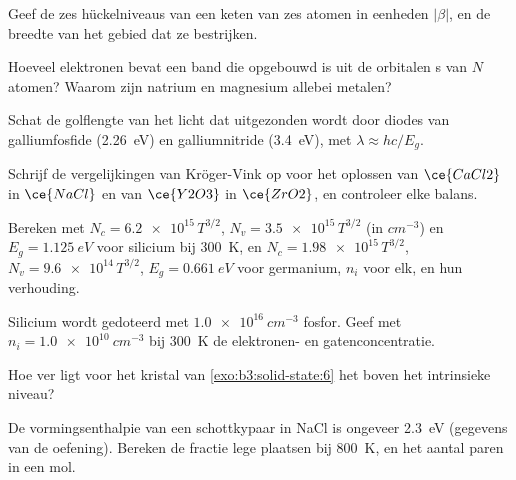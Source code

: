 \begin{exercise}[$\star$]\label{exo:b3:solid-state:1}
Geef de zes hückelniveaus van een keten van zes atomen in eenheden $|\beta|$, en de
breedte van het gebied dat ze bestrijken.
\end{exercise}

\begin{exercise}[$\star$]\label{exo:b3:solid-state:2}
Hoeveel elektronen bevat een band die opgebouwd is uit de orbitalen s
van $N$ atomen? Waarom
zijn natrium en magnesium allebei metalen?
\end{exercise}

\begin{exercise}[$\star$]\label{exo:b3:solid-state:3}
Schat de golflengte van het licht dat uitgezonden wordt door diodes van
galliumfosfide
(\qty{2.26}{eV}) en galliumnitride (\qty{3.4}{eV}), met $\lambda \approx hc/E_g$.
\end{exercise}

\begin{exercise}[$\star$]\label{exo:b3:solid-state:4}
Schrijf de vergelijkingen van Kröger-Vink op voor het oplossen van $\ce{CaCl2}$ in $\ce{NaCl}$ en van $\ce{Y2O3}$ in $\ce{ZrO2}$, en
controleer elke balans.
\end{exercise}

\begin{exercise}[$\star\star$]\label{exo:b3:solid-state:5}
Bereken met $N_c = \num{6.2e15}\,T^{3/2}$, $N_v = \num{3.5e15}\,T^{3/2}$ (in $\unit{cm^{-3}}$) en $E_g = \qty{1.125}{eV}$ voor silicium bij \qty{300}{K},
en $N_c = \num{1.98e15}\,T^{3/2}$, $N_v = \num{9.6e14}\,T^{3/2}$, $E_g = \qty{0.661}{eV}$ voor germanium, $n_i$ voor elk, en hun
verhouding.
\end{exercise}

\begin{exercise}[$\star\star$]\label{exo:b3:solid-state:6}
Silicium wordt gedoteerd met $\qty{1.0e16}{cm^{-3}}$ fosfor. Geef met $n_i = \qty{1.0e10}{cm^{-3}}$ bij \qty{300}{K} de
elektronen- en gatenconcentratie.
\end{exercise}

\begin{exercise}[$\star\star$]\label{exo:b3:solid-state:7}
Hoe ver ligt voor het kristal van \cref{exo:b3:solid-state:6} het
 boven het intrinsieke niveau?
\end{exercise}

\begin{exercise}[$\star\star$]\label{exo:b3:solid-state:8}
De vormingsenthalpie van een schottkypaar in NaCl is ongeveer \qty{2.3}{eV} (gegevens van de
oefening). Bereken de fractie lege plaatsen bij \qty{800}{K}, en het
aantal paren in een mol.
\end{exercise}

